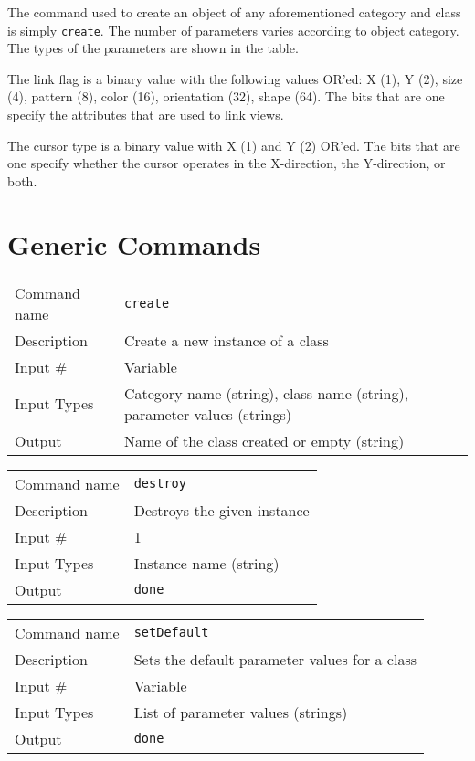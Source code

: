 \bigskip

The command used to create an object of any aforementioned category
and class is simply {\tt create}. The number of parameters varies
according to object category. The types of the parameters are shown in
the table.

The link flag is a binary value with the following values OR'ed: X
(1), Y (2), size (4), pattern (8), color (16), orientation (32), shape
(64). The bits that are one specify the attributes that are used to
link views.

The cursor type is a binary value with X (1) and Y (2) OR'ed. The bits
that are one specify whether the cursor operates in the X-direction,
the Y-direction, or both.

\section{Generic Commands}

\noindent
\begin{tabular}{l|p{5in}}
\hline
Command name & {\tt create} \\
Description  & Create a new instance of a class \\
Input \#     & Variable \\
Input Types  & Category name (string), class name (string), parameter values
               (strings) \\
Output       & Name of the class created or empty (string) \\
\hline
\end{tabular}

\bigskip

\noindent
\begin{tabular}{l|p{5in}}
\hline
Command name & {\tt destroy} \\
Description  & Destroys the given instance \\
Input \#     & 1 \\
Input Types  & Instance name (string) \\
Output       & {\tt done} \\
\hline
\end{tabular}

\bigskip

\noindent
\begin{tabular}{l|p{5in}}
\hline
Command name & {\tt setDefault} \\
Description  & Sets the default parameter values for a class \\
Input \#     & Variable \\
Input Types  & List of parameter values (strings) \\
Output       & {\tt done} \\
\hline
\end{tabular}

